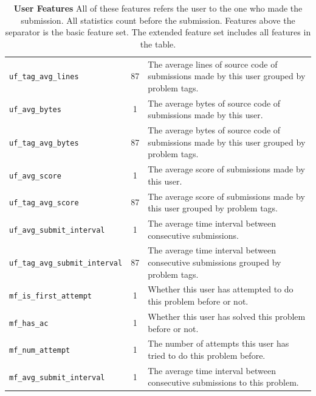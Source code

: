 \begin{table}[hpbt]
\begin{tabular}{lcp{10cm}}
            {\footnotesize\verb|uf_tag_avg_lines|} & 87 &
                The average lines of source code of submissions made by this user grouped by problem tags.\\
            {\footnotesize\verb|uf_avg_bytes|} & 1 &
                The average bytes of source code of submissions made by this user. \\
            {\footnotesize\verb|uf_tag_avg_bytes|} & 87 &
                The average bytes of source code of submissions made by this user grouped by problem tags. \\
            {\footnotesize\verb|uf_avg_score|} & 1 &
                The average score of submissions made by this user. \\
            {\footnotesize\verb|uf_tag_avg_score|} & 87 &
                The average score of submissions made by this user grouped by problem tags. \\
            {\footnotesize\verb|uf_avg_submit_interval|} & 1 &
                The average time interval between consecutive submissions. \\
            {\footnotesize\verb|uf_tag_avg_submit_interval|} & 87 &
                The average time interval between consecutive submissions grouped by problem tags. \\
            {\footnotesize\verb|mf_is_first_attempt|} & 1 &
                Whether this user has attempted to do this problem before or not. \\
            {\footnotesize\verb|mf_has_ac|} & 1 &
                Whether this user has solved this problem before or not. \\
            {\footnotesize\verb|mf_num_attempt|} & 1 &
                The number of attempts this user has tried to do this problem before. \\
            {\footnotesize\verb|mf_avg_submit_interval|} & 1 &
                The average time interval between consecutive submissions to this problem. \\
            \hline
        \end{tabular}
        \caption[User Features]{\textbf{User Features}
            All of these features refers the user to the one who made the submission.
            All statistics count before the submission.
            Features above the separator is the basic feature set.
            The extended feature set includes all features in the table. }
        \label{table:user features}
        \end{table}









